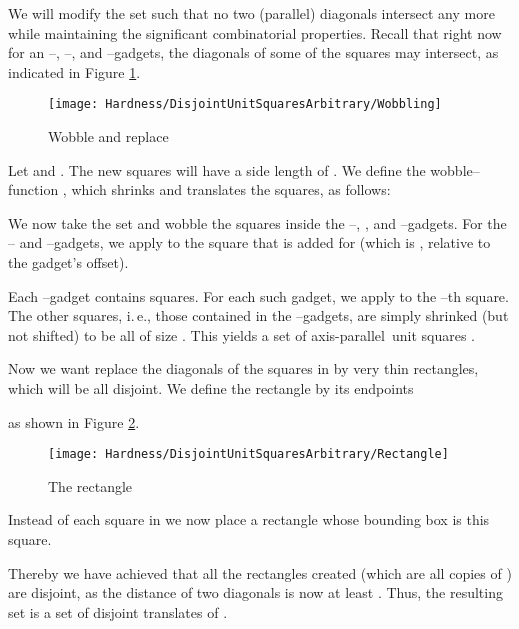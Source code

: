 \documentclass[12pt]{article}
\newcommand{\ap}{a.p.\ }
\renewcommand{\ap}{axis-parallel\ }
\begin{document}
We will modify the set  such that no two (parallel) diagonals intersect any more while maintaining the significant combinatorial properties. Recall that right now for an --, --, and --gadgets, the diagonals of some of the squares may intersect, as indicated in Figure \ref{fig:Wobbling}.
\begin{figure}[ht]
	\centering
		\texttt{[image: Hardness/DisjointUnitSquaresArbitrary/Wobbling]}
	\caption{Wobble and replace}
	\label{fig:Wobbling}
\end{figure}


Let  and . The new squares will have a side length of . We define the wobble--function , which shrinks and translates the squares, as follows:

We now take the set  and wobble the squares inside the --, , and --gadgets. For the -- and --gadgets, we apply  to the square that is added for  (which is , relative to the gadget's offset).

Each --gadget contains  squares. For each such gadget, we apply  to the --th square.
The other squares, i.\,e., those contained in the --gadgets, are simply shrinked (but not shifted) to be all of size . This yields a set of \ap unit squares .

Now we want replace the diagonals of the squares in  by very thin rectangles, which will be all disjoint. We define the rectangle  by its endpoints

as shown in Figure \ref{fig:Rectangle}.
\begin{figure}[ht]
	\centering
		\texttt{[image: Hardness/DisjointUnitSquaresArbitrary/Rectangle]}
	\caption{The rectangle }
	\label{fig:Rectangle}
\end{figure}
Instead of each square in  we now place a rectangle  whose bounding box is this square.

Thereby we have achieved that all the rectangles created (which are all copies of ) are disjoint, as the distance of two diagonals is now at least . Thus, the resulting set  is a set of disjoint translates of .
\end{document}
